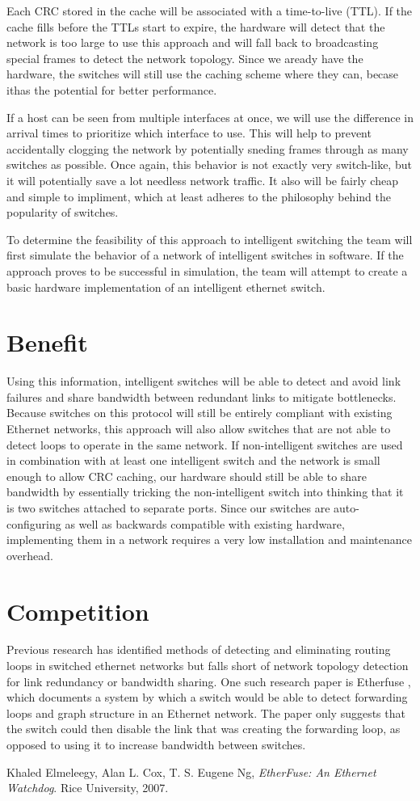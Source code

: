 \documentclass{article}
\begin{document}
	Each CRC stored in the cache will be associated with a time-to-live (TTL).
	If the cache fills before the TTLs start to expire, the hardware will detect that the network is too large to use this approach and will fall back to broadcasting special frames to detect the network topology.
        Since we aready have the hardware, the switches will still use the caching scheme where they can, becase ithas the potential for better performance.

        If a host can be seen from multiple interfaces at once, we will use the difference in arrival times to prioritize which interface to use. 
        This will help to prevent accidentally clogging the network by potentially sneding frames through as many switches as possible. Once again, this behavior is not exactly very switch-like, but it will potentially save a lot needless network traffic. 
        It also will be fairly cheap and simple to impliment, which at least adheres to the philosophy behind the popularity of switches.

	To determine the feasibility of this approach to intelligent switching the team will first simulate the behavior of a network of intelligent switches in software.
	If the approach proves to be successful in simulation, the team will attempt to create a basic hardware implementation of an intelligent ethernet switch.
\section{Benefit}
	Using this information, intelligent switches will be able to detect and avoid link failures and share bandwidth between redundant links to mitigate bottlenecks.
	Because switches on this protocol will still be entirely compliant with existing Ethernet networks, this approach will also allow switches that are not able to detect loops to operate in the same network.
	If non-intelligent switches are used in combination with at least one intelligent switch and the network is small enough to allow CRC caching, our hardware should still be able to share bandwidth by essentially tricking the non-intelligent switch into thinking that it is two switches attached to separate ports.
	Since our switches are auto-configuring as well as backwards compatible with existing hardware, implementing them in a network requires a very low installation and maintenance overhead.
\section{Competition}
	Previous research has identified methods of detecting and eliminating routing loops in switched ethernet networks but falls short of network topology detection for link redundancy or bandwidth sharing.
	One such research paper is Etherfuse \cite{etherfuse}, which documents a system by which a switch would be able to detect forwarding loops and graph structure in an Ethernet network.
	The paper only suggests that the switch could then disable the link that was creating the forwarding loop, as opposed to using it to increase bandwidth between switches.
	
\begin{thebibliography}{9}
	Khaled Elmeleegy, Alan L. Cox, T. S. Eugene Ng,
	\emph{EtherFuse: An Ethernet Watchdog}.
	Rice University, 2007.
\end{thebibliography}
\end{document}
